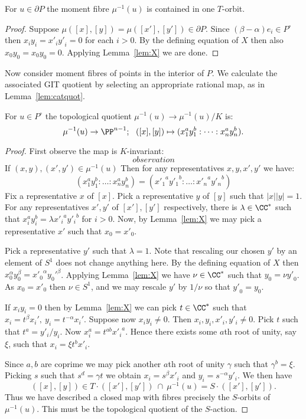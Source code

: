 %
%
%
\begin{lemma} \label{lem:3.2}
For \(u \in \partial P\) the moment fibre \(\mu^{-1}(u)\) is contained in one \(T\)-orbit.
\end{lemma}
%
%
%
\begin{proof}
Suppose \(\mu([x],[y]) = \mu([{x'}],[{y'}]) \in \partial P\). Since \( (\beta - \alpha)e_i \in P^\circ\) then \(x_iy_i = {x'}_i{y'}_i = 0\) for each \(i>0\). By the defining equation of \(X\) then also \(x_0y_0 = x_0y_0 = 0\). Applying Lemma~\ref{lem:X} we are done.
\end{proof}
%
%
%
Now consider moment fibres of points in the interior of \(P\). We calculate the associated GIT quotient by selecting an appropriate rational map, as in Lemma~\ref{lem:catquot}.
\begin{lemma} \label{lem:3.3}
For \(u \in P^\circ\) the topological quotient \(\mu^{-1}(u) \to \mu^{-1}(u)/K \) is:
\[
\mu^{-1}(u) \to \PP^{n-1}; \ \ ([x],[y]) \mapsto (x_1^a y_1^b: \dots : x_n^a y_n^b ).
\]
\end{lemma}
%
%
%
\begin{proof}
First observe the map is  \(K\)-invariant:
\[
observation
\]
 If \((x,y), ({x'},{y'}) \in \mu^{-1}(u)\) Then for any representatives \(x,y,{x'},{y'}\) we have:
\[
(x_1^a y_1^b: \dots : x_n^a y_n^b) = ({x'_1}^a {y'_1}^b: \dots : {x'_n}^a {y'_n}^b)
\]
Fix a representative \(x\) of \([x]\). Pick a representative \(y\) of \([y]\) such that \(|x||y| = 1\). For any representatives \({x'},{y'}\) of \([x'],[y']\) respectively, there is \(\lambda \in \CC^*\) such that \( x_i^a y_i^b = \lambda {{x'_i}}^a {{y'_i}}^b\) for \(i>0\). Now, by Lemma~\ref{lem:X} we may pick a representative \({x'}\) such that \(x_0 = {{x'_0}}\).

Pick a representative \(y'\) such that \(\lambda = 1\). Note that rescaling our chosen \(y'\) by an element of \(S^1\) does not change anything here. By the defining equation of \(X\) then  \(x_0^\alpha y_0^\beta = {x'_0}^\alpha {y_0'}^\beta \). Applying Lemma~\ref{lem:X} we have \(\nu \in \CC^*\) such that \(y_0 = \nu {y'}_0\). As \(x_0 = {x'}_0\) then \(\nu \in S^1\), and we may rescale \({y'}\) by \(1/\nu\) so that \({y'}_0 = y_0\).

If \(x_iy_i = 0\) then by Lemma~\ref{lem:X} we can pick \(t \in \CC^*\) such that \(x_i = t^\beta x_i', \ y_i = t^{-\alpha} x_i'\). Suppose now \(x_iy_i \neq 0\). Then \(x_i,y_i,{x'_i},{y'_i} \neq 0\). Pick \(t\) such that \(t^a = {y'_i}/y_i\). Now \(x_i^a = t^{a b} {x'_i}^a\). Hence there exists some \(a\)th root of unity, say \(\xi\), such that \(x_i = \xi t^b {x'_i}\).

Since \(a,b\) are coprime we may pick another \(a\)th root of unity \(\gamma\) such that \(\gamma^b = \xi\). Picking \(s\) such that \(s^d = \gamma t\) we obtain \(x_i = s^\beta {x'}_i\) and \(y_i = s^{-\alpha} {y'_i}\). We then have
\[
([x],[y]) \in T \cdot ([x'],[y']) \ \cap \ \mu^{-1}(u) = S \cdot ([x'],[y']).
\]
Thus we have described a closed map with fibres precisely the \(S\)-orbits of \(\mu^{-1}(u)\). This must be the topological quotient of the \(S\)-action.
\end{proof}
